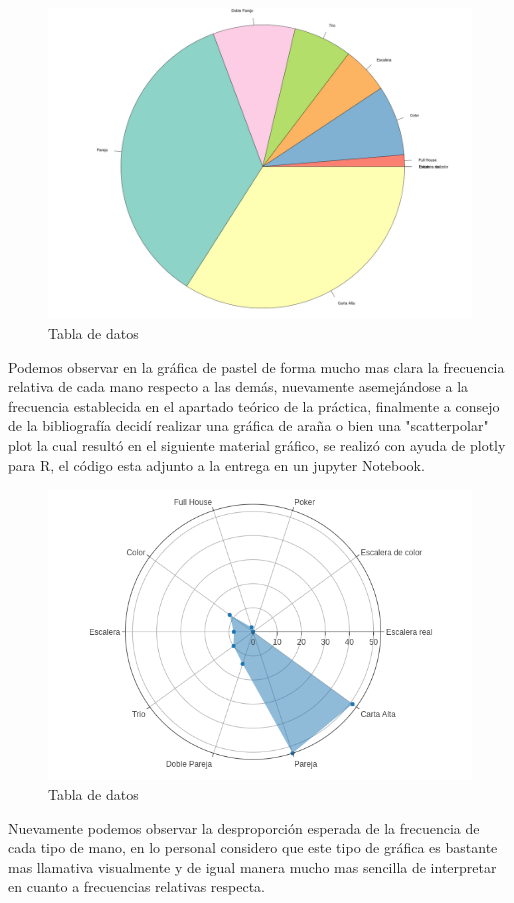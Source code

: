 \documentclass[letterpaper,11pt,dvipsnames]{article}
\begin{document}
\begin{figure}[H]
    \centering
    \includegraphics[scale=0.485]{pie.png}
    \caption{Tabla de datos}
    \label{fig:hipocicloide}
\end{figure}
Podemos observar en la gráfica de pastel de forma mucho mas clara la frecuencia relativa de cada mano respecto a las demás, nuevamente asemejándose a la frecuencia establecida en el apartado teórico de la práctica, finalmente a consejo de la bibliografía decidí realizar una gráfica de araña o bien una "scatterpolar" plot la cual resultó en el siguiente material gráfico, se realizó con ayuda de plotly para R, el código esta adjunto a la entrega en un jupyter Notebook.
\begin{figure}[H]
    \centering
    \includegraphics[scale=0.485]{spider.png}
    \caption{Tabla de datos}
    \label{fig:hipocicloide}
\end{figure}
Nuevamente podemos observar la desproporción esperada de la frecuencia de cada tipo de mano, en lo personal considero que este tipo de gráfica es bastante mas llamativa visualmente y de igual manera mucho mas sencilla de interpretar en cuanto a frecuencias relativas respecta.
\end{document}
